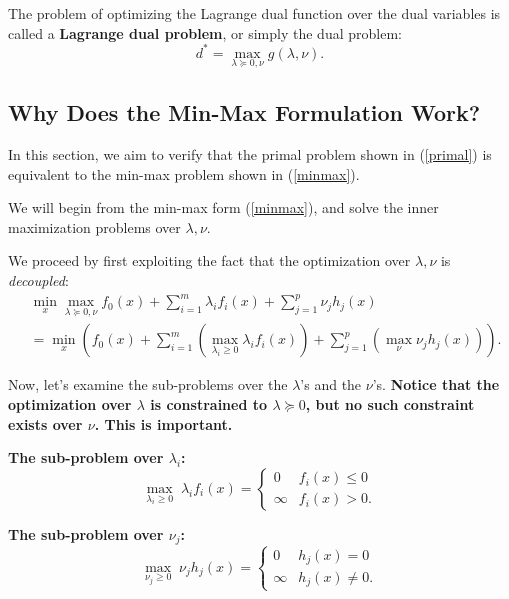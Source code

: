 \documentclass[12pt]{article}
\begin{document}
The problem of optimizing the Lagrange dual function over the dual variables is called a \textbf{Lagrange dual problem}, or simply the dual problem:
%
\begin{equation*}
d^* = \max_{\lambda \succeq 0, \nu} g(\lambda, \nu).
\end{equation*}

\subsection{Why Does the Min-Max Formulation Work?}

In this section, we aim to verify that the primal problem shown in (\ref{primal}) is equivalent to the min-max problem shown in (\ref{minmax}). 

We will begin from the min-max form (\ref{minmax}), and solve the inner maximization problems over $\lambda, \nu$.

We proceed by first exploiting the fact that the optimization over $\lambda, \nu$ is \textit{decoupled}:
%
\begin{align*}
& \min_x \max_{\lambda \succeq 0, \nu} f_0 (x) + \sum_{i=1}^m \lambda_i f_i (x) + \sum_{j=1}^p \nu_j h_j (x) \\
&= \min_x \left( f_0 (x) + \sum_{i=1}^m \left(\max_{\lambda_i \geq 0} \lambda_i f_i (x)\right) + \sum_{j=1}^p \left( \max_{\nu} \nu_j h_j (x) \right) \right).
\end{align*}

Now, let's examine the sub-problems over the $\lambda$'s and the $\nu$'s. \textbf{Notice that the optimization over $\lambda$ is constrained to $\lambda \succeq 0$, but no such constraint exists over $\nu$. This is important.}

\textbf{The sub-problem over $\lambda_i$:}
%
\begin{equation*}
\max_{\lambda_i \geq 0} \; \lambda_i f_i (x) = \left\{ \begin{array}{ll}
0 & f_i (x) \leq 0 \\
\infty & f_i (x) > 0.
\end{array} \right.
\end{equation*}

\textbf{The sub-problem over $\nu_j$:}
%
\begin{equation*}
\max_{\nu_j \geq 0} \; \nu_j h_j(x) = \left\{ \begin{array}{ll}
0 & h_j (x) = 0 \\
\infty & h_j (x) \neq 0.
\end{array} \right.
\end{equation*}
\end{document}
